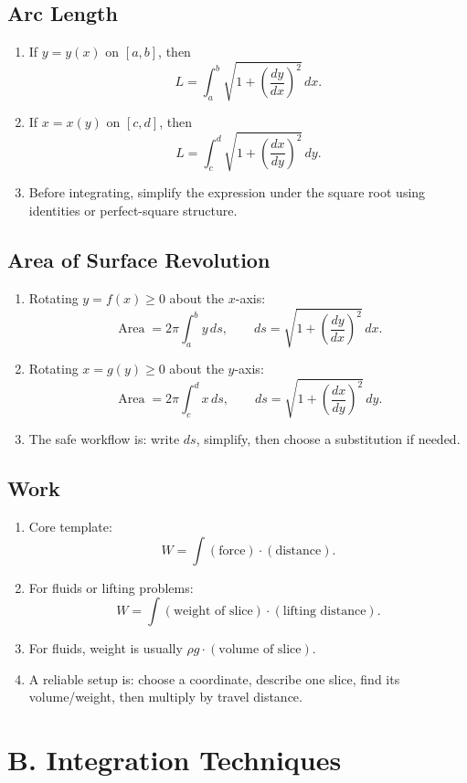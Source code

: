 \documentclass[11pt]{article}
\DeclareMathOperator{\Area}{Area}
\begin{document}
\subsection{Arc Length}
\begin{enumerate}
  \item If $y=y(x)$ on $[a,b]$, then
  \[
  L=\int_a^b \sqrt{1+\left(\frac{dy}{dx}\right)^2}\,dx.
  \]
  \item If $x=x(y)$ on $[c,d]$, then
  \[
  L=\int_c^d \sqrt{1+\left(\frac{dx}{dy}\right)^2}\,dy.
  \]
  \item Before integrating, simplify the expression under the square root using identities or perfect-square structure.
\end{enumerate}

\subsection{Area of Surface Revolution}
\begin{enumerate}
  \item Rotating $y=f(x)\ge 0$ about the $x$-axis:
  \[
  \Area=2\pi\int_a^b y\,ds,\qquad ds=\sqrt{1+\left(\frac{dy}{dx}\right)^2}\,dx.
  \]
  \item Rotating $x=g(y)\ge 0$ about the $y$-axis:
  \[
  \Area=2\pi\int_c^d x\,ds,\qquad ds=\sqrt{1+\left(\frac{dx}{dy}\right)^2}\,dy.
  \]
  \item The safe workflow is: write $ds$, simplify, then choose a substitution if needed.
\end{enumerate}

\subsection{Work}
\begin{enumerate}
  \item Core template:
  \[
  W=\int (\text{force})\cdot(\text{distance}).
  \]
  \item For fluids or lifting problems:
  \[
  W=\int (\text{weight of slice})\cdot(\text{lifting distance}).
  \]
  \item For fluids, weight is usually $\rho g \cdot (\text{volume of slice})$.
  \item A reliable setup is: choose a coordinate, describe one slice, find its volume/weight, then multiply by travel distance.
\end{enumerate}

\section{B. Integration Techniques}
\end{document}

